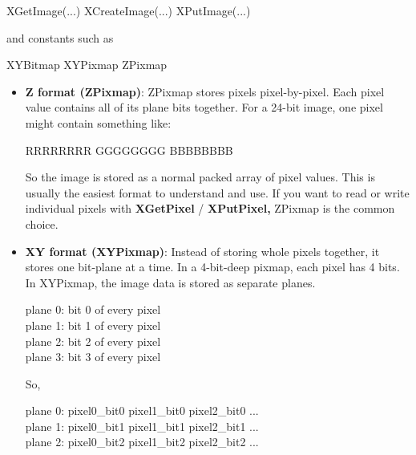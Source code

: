 \documentclass{report}
\begin{document}
\begin{itemize}
            \bigbreak \noindent 
            \begin{cppcode}
            XGetImage(...)
            XCreateImage(...)
            XPutImage(...)
            \end{cppcode}
            \bigbreak \noindent 
            and constants such as
            \bigbreak \noindent 
            \begin{cppcode}
            XYBitmap
            XYPixmap
            ZPixmap
            \end{cppcode}
            \bigbreak \noindent
            \begin{itemize}
                \item \textbf{Z format (ZPixmap)}: ZPixmap stores pixels pixel-by-pixel. Each pixel value contains all of its plane bits together. For a 24-bit image, one pixel might contain something like: 
                    \begin{center}
                     RRRRRRRR \qquad GGGGGGGG \qquad BBBBBBBB                       
                    \end{center}
                    So the image is stored as a normal packed array of pixel values. This is usually the easiest format to understand and use. If you want to read or write individual pixels with \textbf{XGetPixel} / \textbf{XPutPixel,} ZPixmap is the common choice.
                \item \textbf{XY format (XYPixmap)}: Instead of storing whole pixels together, it stores one bit-plane at a time. In a 4-bit-deep pixmap, each pixel has 4 bits. In XYPixmap, the image data is stored as separate planes.
                    \begin{center}
                        plane 0: bit 0 of every pixel \\
                        plane 1: bit 1 of every pixel \\
                        plane 2: bit 2 of every pixel \\
                        plane 3: bit 3 of every pixel
                    \end{center}
                    So,
                    \begin{center}
                        plane 0: \qquad pixel0\_bit0 pixel1\_bit0 pixel2\_bit0 ... \\
                        plane 1: \qquad pixel0\_bit1 pixel1\_bit1 pixel2\_bit1 ...\\
                        plane 2: \qquad pixel0\_bit2 pixel1\_bit2 pixel2\_bit2 ...\\

\end{center}
\end{itemize}
\end{itemize}
\end{document}
